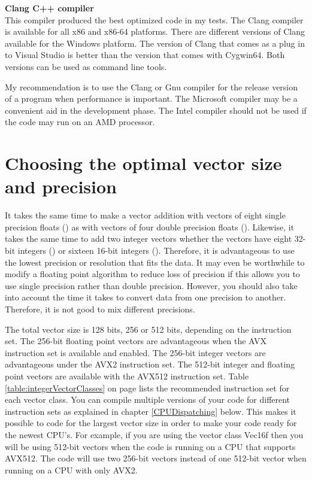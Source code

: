 \documentclass[vcl_manual.tex]{subfiles}
\begin{document}
\textbf{Clang C++ compiler}\\
This compiler produced the best optimized code in my tests. The Clang compiler is available for all x86 and x86-64 platforms. There are different versions of Clang available for the Windows platform. The version of Clang that comes as a plug in to Visual Studio is better than the version that comes with Cygwin64. Both versions can be used as command line tools.

My recommendation is to use the Clang or Gnu compiler for the release version of a program when performance is important. The Microsoft compiler may be a convenient aid in the development phase. The Intel compiler should not be used if the code may run on an AMD processor.


\section{Choosing the optimal vector size and precision} \label{ChoosingOptimalVectorSize}

It takes the same time to make a vector addition with vectors of eight single precision floats () as with vectors of four double precision floats (). Likewise, it takes the same time to add two integer vectors whether the vectors have eight 32-bit integers () or sixteen 16-bit integers (). Therefore, it is advantageous to use the lowest precision or resolution that fits the data. It may even be worthwhile to modify a floating point algorithm to reduce loss of precision if this allows you to use single precision rather than double precision. However, you should also take into account the time it takes to convert data from one precision to another. Therefore, it is not good to mix different precisions.

The total vector size is 128 bits, 256 or 512 bits, depending on the instruction set. 
The 256-bit floating point vectors are advantageous when the AVX instruction set is available and enabled. The 256-bit integer vectors are advantageous under the AVX2 instruction set. 
The 512-bit integer and floating point vectors are available with the AVX512 instruction set.
Table \ref{table:integerVectorClasses} on page \pageref{table:integerVectorClasses} lists the recommended instruction set for each vector class. 
You can compile multiple versions of your code for different instruction sets as explained in chapter \ref{CPUDispatching} below. This makes it possible to code for the largest vector size in order to make your code ready for the newest CPU's. 
For example, if you are using the vector class Vec16f then you will be using 512-bit vectors when the code is running on a CPU that supports AVX512. The code will use two 256-bit vectors instead of one 512-bit vector when running on a CPU with only AVX2.
\end{document}
